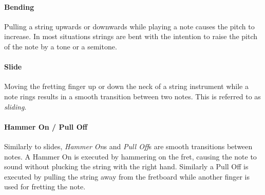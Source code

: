 \paragraph{Bending}
Pulling a string upwards or downwards while playing a note causes the pitch to increase. In most situations strings are bent with the intention to raise the pitch of the note by a tone or a semitone.

\paragraph{Slide}
Moving the fretting finger up or down the neck of a string instrument while a note rings results in a smooth transition between two notes. This is referred to as \textit{sliding}.

\paragraph{Hammer On / Pull Off}
Similarly to slides, \textit{Hammer On}s and \textit{Pull Off}s are smooth transitions between notes. A Hammer On is executed by hammering on the fret, causing the note to sound without plucking the string with the right hand. Similarly a Pull Off is executed by pulling the string away from the fretboard while another finger is used for fretting the note.
